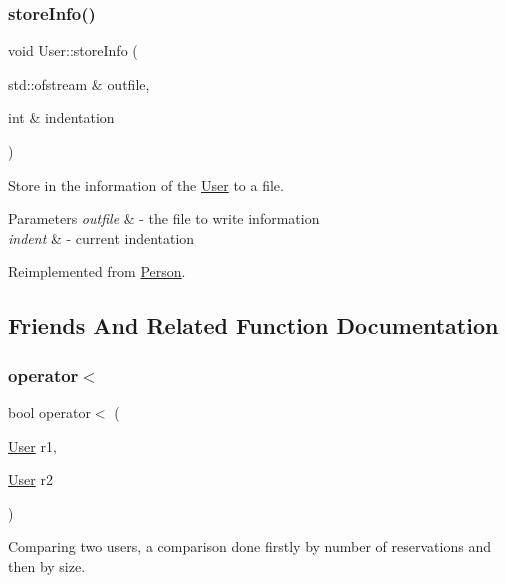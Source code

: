 \subsubsection{\texorpdfstring{store\+Info()}{storeInfo()}}
{\footnotesize\ttfamily void User\+::store\+Info (\begin{DoxyParamCaption}\item[{std\+::ofstream \&}]{outfile,  }\item[{int \&}]{indentation }\end{DoxyParamCaption})\hspace{0.3cm}{\ttfamily [virtual]}}



Store in the information of the \mbox{\hyperlink{class_user}{User}} to a file. 


\begin{DoxyParams}{Parameters}
{\em outfile} & -\/ the file to write information \\
\hline
{\em indent} & -\/ current indentation \\
\hline
\end{DoxyParams}


Reimplemented from \mbox{\hyperlink{class_person_a80f87df3f644706c2ad8fc8b800fdd95}{Person}}.



\subsection{Friends And Related Function Documentation}
\mbox{\label{class_user_a87114b6342ed4dc307aa3a185258b4c0}} 
\subsubsection{\texorpdfstring{operator$<$}{operator<}}
{\footnotesize\ttfamily bool operator$<$ (\begin{DoxyParamCaption}\item[{\mbox{\hyperlink{class_user}{User}}}]{r1,  }\item[{\mbox{\hyperlink{class_user}{User}}}]{r2 }\end{DoxyParamCaption})\hspace{0.3cm}{\ttfamily [friend]}}



Comparing two users, a comparison done firstly by number of reservations and then by size. 


